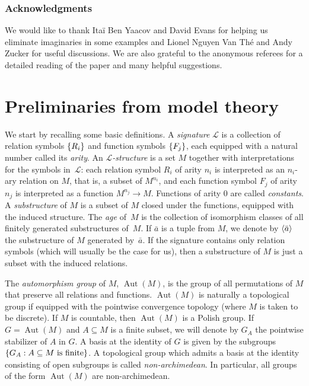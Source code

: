 \documentclass[JEP,XML,SOM,Unicode,published]{cedram}
\let\mathcal\mathscr
\let\sub\subseteq
\theoremstyle{plain}
\theoremstyle{definition}
\newcommand{\cL}{\mathcal{L}}
\DeclareMathOperator{\Aut}{Aut}
\DeclarePairedDelimiter\gen{\langle}{\rangle}
\DeclarePairedDelimiter\set{\{}{\}}
\begin{document}
\subsubsection*{Acknowledgments} We would like to thank Itaï Ben Yaacov and David Evans for helping us eliminate imaginaries in some examples and Lionel Nguyen Van Thé and Andy Zucker for useful discussions. We are also grateful to the anonymous referees for a detailed reading of the paper and many helpful suggestions.


\section{Preliminaries from model theory}
\label{sec:prel-from-model}

We start by recalling some basic definitions. A \emph{signature} $\cL$ is a collection of relation symbols $\set{R_i}$ and function symbols $\set{F_j}$, each equipped with a natural number called its \emph{arity}. An \emph{$\cL$-structure} is a set $M$ together with interpretations for the symbols in~$\cL$: each relation symbol $R_i$ of arity $n_i$ is interpreted as an $n_i$-ary relation on $M$, that is, a subset of $M^{n_i}$, and each function symbol $F_j$ of arity $n_j$ is interpreted as a function $M^{n_j} \to M$. Functions of arity $0$ are called \emph{constants}. A \emph{substructure} of $M$ is a subset of $M$ closed under the functions, equipped with the induced structure. The \emph{age} of~$M$ is the collection of isomorphism classes of all finitely generated substructures of~$M$. If $\bar a$ is a tuple from $M$, we denote by $\gen{\bar a}$ the substructure of $M$ generated by~$\bar a$. If the signature contains only relation symbols (which will usually be the case for us), then a substructure of $M$ is just a subset with the induced relations.

The \emph{automorphism group} of $M$, $\Aut(M)$, is the group of all permutations of $M$ that preserve all relations and functions. $\Aut(M)$ is naturally a topological group if equipped with the pointwise convergence topology (where $M$ is taken to be discrete). If $M$ is countable, then $\Aut(M)$ is a Polish group. If $G = \Aut(M)$ and $A \sub M$ is a finite subset, we will denote by $G_{A}$ the pointwise stabilizer of $A$ in $G$. A basis at the identity of $G$ is given by the subgroups $\set{G_A : A \sub M \text{ is finite}}$. A topological group which admits a basis at the identity consisting of open subgroups is called \emph{non-archimedean}. In particular, all groups of the form $\Aut(M)$ are non-archimedean.
\end{document}
